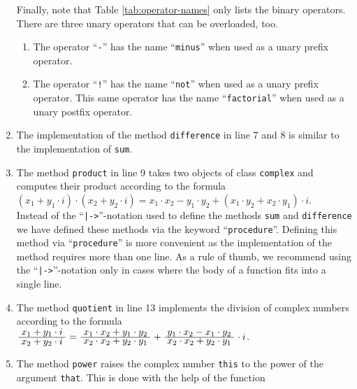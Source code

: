 \begin{enumerate}
      Finally, note that Table \ref{tab:operator-names} only lists the binary operators.  
      There are three unary operators that can be overloaded, too.
      \begin{enumerate}
      \item The operator ``\texttt{-}'' has the name ``\texttt{minus}'' when used as a unary prefix
            operator. 
      \item The operator ``\texttt{!}'' has the name ``\texttt{not}'' when used as a unary prefix
            operator.  This same operator has the name ``\texttt{factorial}'' when used as a unary
            postfix operator.
      \end{enumerate}
\item The implementation of the method \texttt{difference} in line 7 and 8 is similar to
      the implementation of \texttt{sum}.
\item The method \texttt{product} in line 9 takes two objects of class \texttt{complex}
      and computes their product according to the formula
      \\[0.2cm]
      \hspace*{1.3cm}
      $(x_1 + y_1 \cdot i) \cdot (x_2 + y_2 \cdot i) = 
       x_1 \cdot x_2 - y_1 \cdot y_2 + (x_1 \cdot y_2 + x_2 \cdot y_1) \cdot i
      $.
      \\[0.2cm]
      Instead of the ``\texttt{|->}''-notation used to define the methods \texttt{sum} and
      \texttt{difference} we have defined these methods via the keyword
      ``\texttt{procedure}''.  Defining this method via ``\texttt{procedure}'' is more
      convenient as the implementation of the method requires more than one line.
      As a rule of thumb, we recommend using the ``\texttt{|->}''-notation only in cases
      where the body of a function fits into a single line.
\item The method \texttt{quotient} in line 13 implements the division of complex numbers
      according to the formula
      \\[0.2cm]
      \hspace*{1.3cm}
      ${\displaystyle\; x_1 + y_1 \cdot i \;\over \displaystyle x_2 + y_2 \cdot i} = 
       {\displaystyle\; x_1 \cdot x_2 + y_1 \cdot y_2 \;\over \displaystyle x_2 \cdot x_2 + y_2 \cdot y_1} +
       {\displaystyle\; y_1 \cdot x_2 - x_1 \cdot y_2 \;\over \displaystyle x_2 \cdot x_2 + y_2 \cdot y_1} \cdot i
      $.
\item The method \texttt{power} raises the complex number \texttt{this} to the power of
      the argument \texttt{that}.  This is done with the help of the function

\end{enumerate}

